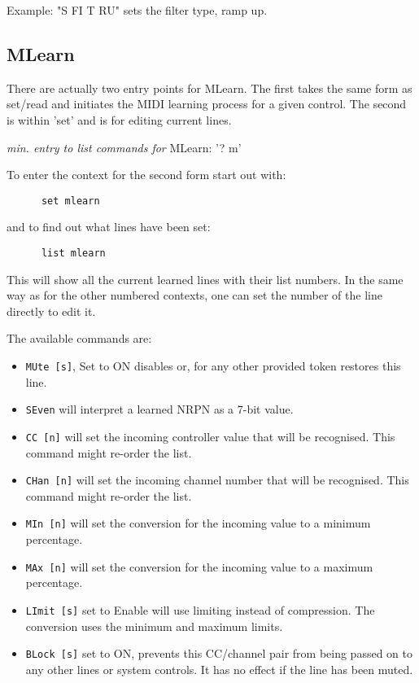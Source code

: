    Example: "S FI T RU" sets the filter type, ramp up.

\pagebreak
\subsection{MLearn}
\label{subsec:command_line_mlearn}
   There are actually two entry points for MLearn. The first takes the same
   form as set/read and initiates the MIDI learning process for a given
   control. The second is within 'set' and is for editing current lines.

   \textsl{min. entry to list commands for} MLearn: '? m'

   To enter the context for the second form start out with:
   \begin{verbatim}
      set mlearn
   \end{verbatim}
   and to find out what lines have been set:
   \begin{verbatim}
      list mlearn
   \end{verbatim}
   This will show all the current learned lines with their list numbers.
   In the same way as for the other numbered contexts, one can set the number
   of the line directly to edit it.

   The available commands are:

   \begin{itemize}
      \item \texttt{MUte [s]}, Set to ON disables or, for any other provided
      token restores this line.
      \item \texttt{SEven} will interpret a learned NRPN as a 7-bit value.
      \item \texttt{CC [n]} will set the incoming controller value that will
         be recognised.  This command might re-order the list.
      \item \texttt{CHan [n]} will set the incoming channel number that will
         be recognised.  This command might re-order the list.
      \item \texttt{MIn [n]} will set the conversion for the incoming
         value to a minimum percentage.
      \item \texttt{MAx [n]} will set the conversion for the incoming
         value to a maximum percentage.
      \item \texttt{LImit [s]} set to Enable will use limiting instead of
         compression.  The conversion uses the minimum and maximum limits.
      \item \texttt{BLock [s]} set to ON, prevents this CC/channel pair from
        being passed on to any other lines or system controls.  It has no
        effect if the line has been muted.
   \end{itemize}

